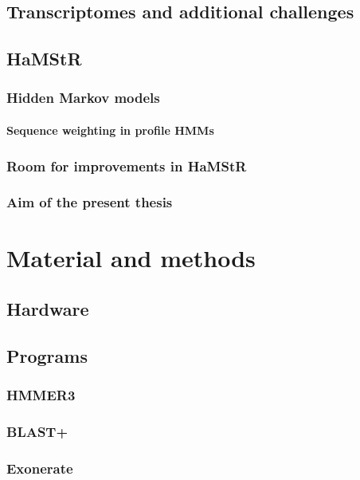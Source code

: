 \documentclass[a4paper,12pt]{scrreprt}
\newcommand{\hamstr}{HaMStR\xspace}
\begin{document}
	\section{Transcriptomes and additional challenges}
		
	\section{\hamstr}
		
		\subsection{Hidden Markov models}
			
			\subsubsection{Sequence weighting in profile HMMs}
				
		\subsection{Room for improvements in \hamstr}
			
		\subsection{Aim of the present thesis}
			

\chapter{Material and methods}
	\section{Hardware}
		
	\section{Programs}
		
		\subsection{HMMER3}
			
		\subsection{BLAST+}
			
		\subsection{Exonerate}
			
\end{document}
